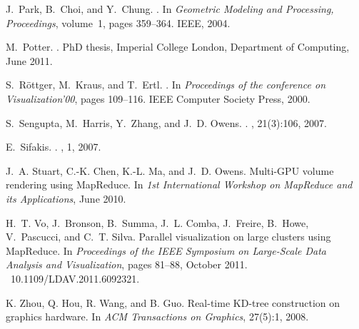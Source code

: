 \documentclass[10pt,journal,cspaper,compsoc]{IEEEtran}
\begin{document}
\begin{thebibliography}{10}
J.~Park, B.~Choi, and Y.~Chung.
.
\newblock In {\em Geometric Modeling and Processing, Proceedings}, volume~1,
  pages 359--364. IEEE, 2004.

M.~Potter.
.
\newblock PhD thesis, Imperial College London, Department of Computing, June
  2011.

S.~R\"{o}ttger, M.~Kraus, and T.~Ertl.
.
\newblock In {\em Proceedings of the conference on Visualization'00}, pages
  109--116. IEEE Computer Society Press, 2000.

S.~Sengupta, M.~Harris, Y.~Zhang, and J.~D. Owens.
.
, 21(3):106, 2007.

E.~Sifakis.
.
, 1, 2007.

J.~A. Stuart, C.-K. Chen, K.-L. Ma, and J.~D. Owens.
\newblock Multi-{GPU} volume rendering using {MapReduce}.
\newblock In {\em 1st International Workshop on MapReduce and its
  Applications}, June 2010.

H.~T. Vo, J.~Bronson, B.~Summa, J.~L. Comba, J.~Freire, B.~Howe, V.~Pascucci,
  and C.~T. Silva.
\newblock Parallel visualization on large clusters using {MapReduce}.
\newblock In {\em Proceedings of the IEEE Symposium on Large-Scale Data
  Analysis and Visualization}, pages 81--88, October 2011.
~10.1109/LDAV.2011.6092321.

K. Zhou, Q. Hou, R. Wang, and B. Guo.
\newblock Real-time KD-tree construction on graphics hardware.
\newblock In {\em ACM Transactions on Graphics}, 27(5):1, 2008.

\end{thebibliography}

%

\end{document}
